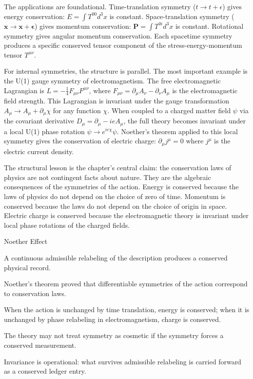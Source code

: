 The applications are foundational. Time-translation symmetry ($t \to t +
\epsilon$) gives energy conservation: $E = \int T^{00} d^3x$ is constant.
Space-translation symmetry ($\mathbf{x} \to \mathbf{x} + \boldsymbol{\epsilon}$)
gives momentum conservation: $\mathbf{P} = \int T^{0i} d^3x$ is constant.
Rotational symmetry gives angular momentum conservation. Each spacetime
symmetry produces a specific conserved tensor component of the
stress-energy-momentum tensor $T^{\mu\nu}$.

For internal symmetries, the structure is parallel. The most important
example is the U(1) gauge symmetry of electromagnetism. The free
electromagnetic Lagrangian is $L = -\frac{1}{4} F_{\mu\nu} F^{\mu\nu}$,
where $F_{\mu\nu} = \partial_\mu A_\nu - \partial_\nu A_\mu$ is the
electromagnetic field strength. This Lagrangian is invariant under the
gauge transformation $A_\mu \to A_\mu + \partial_\mu \chi$ for any
function $\chi$. When coupled to a charged matter field $\psi$ via the
covariant derivative $D_\mu = \partial_\mu - ieA_\mu$, the full theory
becomes invariant under a local U(1) phase rotation $\psi \to e^{ie\chi}
\psi$. Noether's theorem applied to this local symmetry gives the
conservation of electric charge: $\partial_\mu j^\mu = 0$ where $j^\mu$
is the electric current density.

The structural lesson is the chapter's central claim: the conservation
laws of physics are not contingent facts about nature. They are the
algebraic consequences of the symmetries of the action. Energy is
conserved because the laws of physics do not depend on the choice of
zero of time. Momentum is conserved because the laws do not depend on
the choice of origin in space. Electric charge is conserved because the
electromagnetic theory is invariant under local phase rotations of the
charged fields.

\begin{phenom}{Noether Effect}
\label{ph:noether-effect}

\PhStatement A continuous admissible relabeling of the description produces a
conserved physical record.

\PhOrigin Noether's theorem proved that differentiable symmetries of the action
correspond to conservation laws.

\PhObservation When the action is unchanged by time translation, energy is
conserved; when it is unchanged by phase relabeling in electromagnetism, charge
is conserved.

\PhConstraint The theory may not treat symmetry as cosmetic if the symmetry
forces a conserved measurement.

\PhConsequence Invariance is operational: what survives admissible relabeling
is carried forward as a conserved ledger entry.

\end{phenom}

